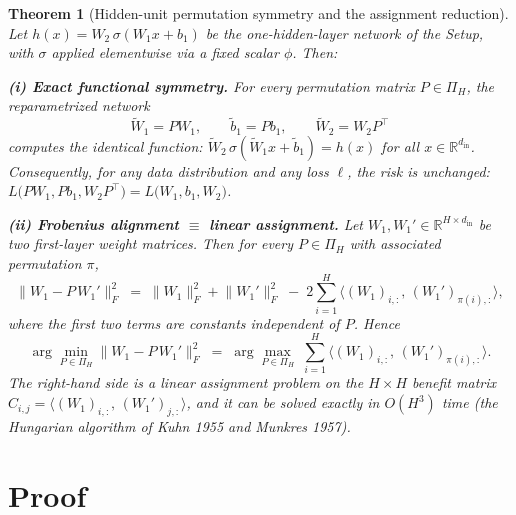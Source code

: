\documentclass[11pt]{article}
\newtheorem{theorem}{Theorem}
\theoremstyle{definition}
\theoremstyle{remark}
\begin{document}
\begin{theorem}[Hidden-unit permutation symmetry and the assignment reduction]
\label{thm:main}
Let $h(x)=W_2\,\sigma(W_1 x + b_1)$ be the one-hidden-layer network of the Setup, with $\sigma$
applied elementwise via a fixed scalar $\phi$. Then:

\smallskip
\noindent\textbf{(i) Exact functional symmetry.} For every permutation matrix $P\in\Pi_H$, the
reparametrized network
\[
\widetilde W_1=P W_1,\qquad \widetilde b_1 = P b_1,\qquad \widetilde W_2 = W_2 P^{\top}
\]
computes the identical function: $\widetilde W_2\,\sigma(\widetilde W_1 x + \widetilde b_1)=h(x)$ for
\emph{all} $x\in\mathbb{R}^{d_{\mathrm{in}}}$. Consequently, for any data distribution and any loss
$\ell$, the risk is unchanged: $L\bigl(P W_1, P b_1, W_2 P^{\top}\bigr)=L\bigl(W_1,b_1,W_2\bigr)$.

\smallskip
\noindent\textbf{(ii) Frobenius alignment $\equiv$ linear assignment.} Let
$W_1,W_1'\in\mathbb{R}^{H\times d_{\mathrm{in}}}$ be two first-layer weight matrices. Then for every
$P\in\Pi_H$ with associated permutation $\pi$,
\[
\bigl\lVert W_1 - P\,W_1'\bigr\rVert_F^2
\;=\;\lVert W_1\rVert_F^2 + \lVert W_1'\rVert_F^2
\;-\;2\sum_{i=1}^{H}\bigl\langle (W_1)_{i,:},\,(W_1')_{\pi(i),:}\bigr\rangle ,
\]
where the first two terms are constants independent of $P$. Hence
\[
\arg\min_{P\in\Pi_H}\bigl\lVert W_1 - P\,W_1'\bigr\rVert_F^2
\;=\;\arg\max_{P\in\Pi_H}\;\sum_{i=1}^{H}\bigl\langle (W_1)_{i,:},\,(W_1')_{\pi(i),:}\bigr\rangle .
\]
The right-hand side is a linear assignment problem on the $H\times H$ benefit matrix
$C_{i,j}=\langle (W_1)_{i,:},\,(W_1')_{j,:}\rangle$, and it can be solved \emph{exactly} in
$O(H^3)$ time (the Hungarian algorithm of Kuhn 1955 and Munkres 1957).
\end{theorem}

\section*{Proof}
\end{document}
